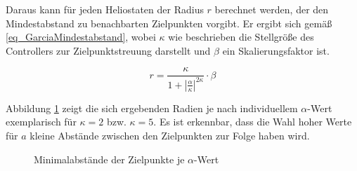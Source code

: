 Daraus kann für jeden Heliostaten der Radius $r$ berechnet werden, der den Mindestabstand zu benachbarten Zielpunkten vorgibt.
Er ergibt sich gemäß \ref{eq_GarciaMindestabstand}, wobei $\kappa$ wie beschrieben die Stellgröße des Controllers zur Zielpunktstreuung darstellt und $\beta$ ein Skalierungsfaktor ist.

\begin{equation} \label{eq_GarciaMindestabstand}
    r=\frac{\kappa}{1+\left|\frac{\alpha}{\kappa}\right|^{2\kappa}}\cdot\beta
\end{equation}

Abbildung \ref{fig_Verteilunglpha} zeigt die sich ergebenden Radien je nach individuellem $\alpha$-Wert exemplarisch für $\kappa=2$ bzw. $\kappa=5$.
Es ist erkennbar, dass die Wahl hoher Werte für $a$ kleine Abstände zwischen den Zielpunkten zur Folge haben wird.

\begin{figure}[h!]
    \centering
    \setlength{\fboxsep}{1pt}
    \setlength{\fboxrule}{1pt}
    \caption[Minimalabstände der Zielpunkte je $\alpha$-Wert]{Minimalabstände der Zielpunkte je $\alpha$-Wert \cite[S.9]{Garcia2}}
    \label{fig_Verteilunglpha}
\end{figure}

